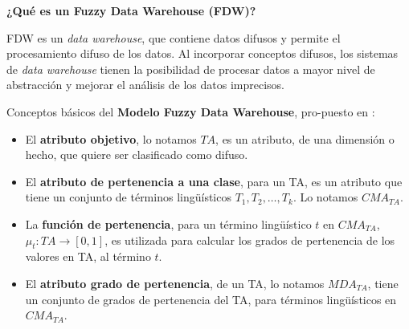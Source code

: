 \documentclass{fancyslides}
\begin{document}
\begin{frame}
\misc
{
\textbf{¿Qué es un Fuzzy Data Warehouse (FDW)?}
\newline

\justifying FDW es un \textit{data warehouse}, que contiene datos difusos y permite el procesamiento difuso de los datos. Al incorporar conceptos difusos, los sistemas de \textit{data warehouse} tienen la posibilidad de procesar datos a mayor nivel de abstracción y mejorar el análisis de los datos imprecisos.
}
\end{frame}


\begin{frame}
\misc
{
\justifying Conceptos básicos del \textbf{Modelo Fuzzy Data Warehouse}, pro-puesto en \cite{Fasel14}:

\begin{itemize}

  \item \justifying El \textbf{atributo objetivo}, lo notamos $TA$, es un atributo, de una dimensión o hecho, que quiere ser clasificado como difuso.

  \item \justifying El \textbf{atributo de pertenencia a una clase}, para un TA, es un atributo que tiene un conjunto de términos lingüísticos $T_{1},T_{2}, \ldots , T_{k}$. Lo notamos $CMA_{TA}$.
\end{itemize}
}
\end{frame}


\begin{frame}
\misc
{
\begin{itemize}

  \item \justifying La \textbf{función de pertenencia}, para un término lingüístico $t$ en $CMA_{TA}$, $\mu_{t} : TA \rightarrow [0,1]$,
  es utilizada para calcular los grados de pertenencia de los valores en TA, al término $t$.

  \item \justifying El \textbf{atributo grado de pertenencia}, de un TA, lo notamos $MDA_{TA}$, tiene un conjunto de grados de pertenencia del TA,
  para términos lingüísticos en $CMA_{TA}$.
\end{itemize}
}
\end{frame}
\end{document}
